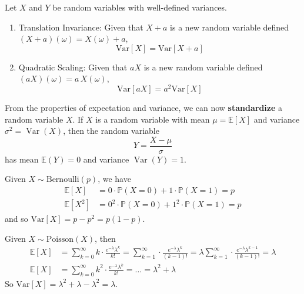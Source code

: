 \documentclass{article}
\DeclareMathOperator{\Var}{Var}
\begin{document}
    \begin{lemma}
      Let $X$ and $Y$ be random variables with well-defined variances. 
      \begin{enumerate}
        \item Translation Invariance: Given that $X + a$ is a new random variable defined $(X + a)(\omega) = X(\omega) + a$, 
        \begin{equation}
          \mathrm{Var}[X] = \mathrm{Var}[X + a]
        \end{equation}
        \item Quadratic Scaling: Given that $aX$ is a new random variable defined $(aX)(\omega) = a\,X(\omega)$, 
        \begin{equation}
          \mathrm{Var}[aX] = a^2 \mathrm{Var}[X]
        \end{equation}
      \end{enumerate}
    \end{lemma}

    From the properties of expectation and variance, we can now \textbf{standardize} a random variable $X$. If $X$ is a random variable with mean $\mu = \mathbb{E}[X]$ and variance $\sigma^2 = \Var(X)$, then the random variable 
    \begin{equation}
      Y = \frac{X - \mu}{\sigma}
    \end{equation}
    has mean $\mathbb{E}(Y) = 0$ and variance $\Var(Y) = 1$. 

    \begin{example}[Bernoulli]
      Given $X \sim \mathrm{Bernoulli}(p)$, we have
      \begin{align*}
        \mathbb{E}[X] & = 0 \cdot \mathbb{P}(X = 0) + 1 \cdot \mathbb{P}(X = 1) = p \\
        \mathbb{E}[X^2] & =  0^2 \cdot \mathbb{P}(X = 0) + 1^2 \cdot \mathbb{P}(X = 1) = p
      \end{align*}
      and so $\mathrm{Var}[X] = p - p^2 = p(1 - p)$. 
    \end{example}

    \begin{example}[Poisson]
      Given $X \sim \mathrm{Poisson}(X)$, then 
      \begin{align*}
        \mathbb{E}[X] & = \sum_{k = 0}^\infty k \cdot \frac{e^{-\lambda} \lambda^k}{k!} = \sum_{k = 1}^\infty \cdot \frac{e^{-\lambda} \lambda^k}{(k-1)!} = \lambda \sum_{k = 1}^\infty \cdot \frac{e^{-\lambda} \lambda^{k-1}}{(k-1)!} = \lambda\\
        \mathbb{E}[X] & = \sum_{k=0}^\infty k^2 \cdot \frac{e^{-\lambda} \lambda^k}{k!} = \ldots = \lambda^2 + \lambda
      \end{align*}
      So $\mathrm{Var}[X] = \lambda^2 + \lambda - \lambda^2 = \lambda$. 
    \end{example}
\end{document}
